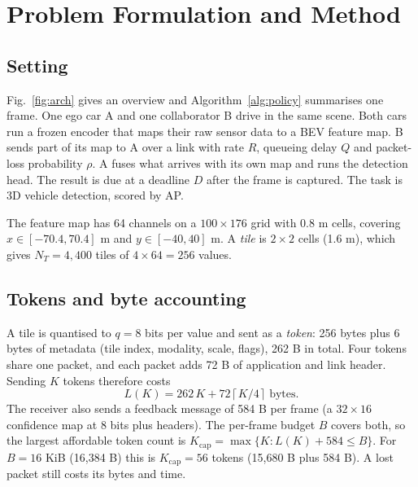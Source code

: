 \documentclass[conference]{IEEEtran}
\begin{document}
\section{Problem Formulation and Method}\label{sec:method}
\subsection{Setting}
Fig.~\ref{fig:arch} gives an overview and Algorithm~\ref{alg:policy} summarises one frame. One ego car A and one collaborator B drive in the same scene. Both cars run a frozen encoder that maps their raw sensor data to a BEV feature map. B sends part of its map to A over a link with rate $R$, queueing delay $Q$ and packet-loss probability $\rho$. A fuses what arrives with its own map and runs the detection head. The result is due at a deadline $D$ after the frame is captured. The task is 3D vehicle detection, scored by AP.

The feature map has 64 channels on a $100\times176$ grid with 0.8 m cells, covering $x\in[-70.4,70.4]$ m and $y\in[-40,40]$ m. A \emph{tile} is $2\times2$ cells (1.6 m), which gives $N_T=4{,}400$ tiles of $4\times64=256$ values.

\subsection{Tokens and byte accounting}
A tile is quantised to $q=8$ bits per value and sent as a \emph{token}: 256 bytes plus 6 bytes of metadata (tile index, modality, scale, flags), 262 B in total. Four tokens share one packet, and each packet adds 72 B of application and link header. Sending $K$ tokens therefore costs
\begin{equation}
L(K)=262\,K+72\left\lceil K/4\right\rceil\ \text{bytes}.\label{eq:bytes}
\end{equation}
The receiver also sends a feedback message of 584 B per frame (a $32\times16$ confidence map at 8 bits plus headers). The per-frame budget $B$ covers both, so the largest affordable token count is $K_{\mathrm{cap}}=\max\{K: L(K)+584\le B\}$. For $B=16$ KiB (16,384 B) this is $K_{\mathrm{cap}}=56$ tokens (15,680 B plus 584 B). A lost packet still costs its bytes and time.
\end{document}
